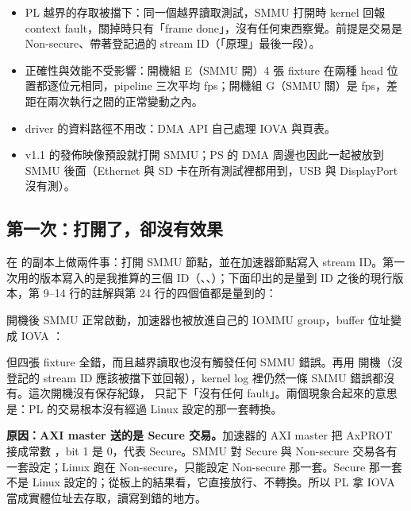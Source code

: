 \begin{gain}
\begin{itemize}
\item PL 越界的存取被擋下：同一個越界讀取測試，SMMU 打開時 kernel 回報 context fault，關掉時只有「frame done」，沒有任何東西察覺。前提是交易是 Non-secure、帶著登記過的 stream ID（「原理」最後一段）。
\item 正確性與效能不受影響：開機組 E（SMMU 開）4 張 fixture 在兩種 head 位置都逐位元相同，pipeline 三次平均 \smmuOnFps{} fps；開機組 G（SMMU 關）是 \smmuOffFps{} fps，差距在兩次執行之間的正常變動之內。
\item driver 的資料路徑不用改：DMA API 自己處理 IOVA 與頁表。
\item v1.1 的發佈映像預設就打開 SMMU；PS 的 DMA 周邊也因此一起被放到 SMMU 後面（Ethernet 與 SD 卡在所有測試裡都用到，USB 與 DisplayPort 沒有測）。
\end{itemize}
\end{gain}

\subsection{第一次：打開了，卻沒有效果}

 在  的副本上做兩件事：打開 SMMU 節點，並在加速器節點寫入 stream ID。第一次用的版本寫入的是我推算的三個 ID（、、）；下面印出的是量到 ID 之後的現行版本，第 9--14 行的註解與第 24 行的四個值都是量到的：


開機後 SMMU 正常啟動，加速器也被放進自己的 IOMMU group，buffer 位址變成 IOVA ：


但四張 fixture 全錯，而且越界讀取也沒有觸發任何 SMMU 錯誤。再用  開機（沒登記的 stream ID 應該被擋下並回報），kernel log 裡仍然一條 SMMU 錯誤都沒有。這次開機沒有保存紀錄， 只記下「沒有任何 fault」。兩個現象合起來的意思是：PL 的交易根本沒有經過 Linux 設定的那一套轉換。

\textbf{原因：AXI master 送的是 Secure 交易。}加速器的 AXI master 把 AxPROT 接成常數 ，bit 1 是 0，代表 Secure。SMMU 對 Secure 與 Non-secure 交易各有一套設定；Linux 跑在 Non-secure，只能設定 Non-secure 那一套。Secure 那一套不是 Linux 設定的；從板上的結果看，它直接放行、不轉換。所以 PL 拿 IOVA 當成實體位址去存取，讀寫到錯的地方。

